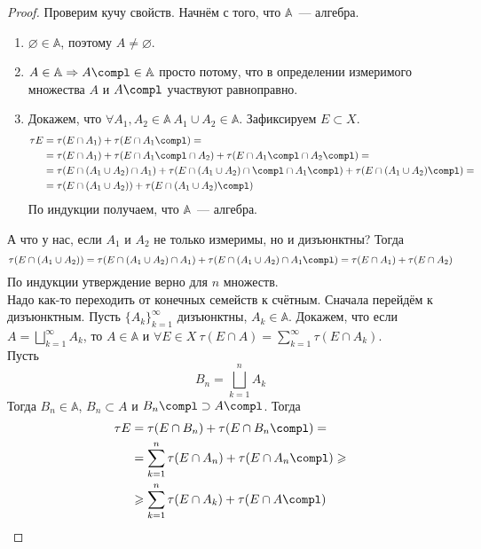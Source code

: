 \documentclass{article}
\begin{document}
    \begin{proof}
        Проверим кучу свойств. Начнём с того, что $\mathbb A$~--- алгебра.
        \begin{enumerate}
            \addtocounter{enumi}{-1}
            \item $\varnothing\in\mathbb A$, поэтому $A\neq\varnothing$.
            \item $A\in\mathbb A\Rightarrow A\compl\in\mathbb A$ просто потому, что в определении измеримого множества $A$ и $A\compl$ участвуют равноправно.
            \item Докажем, что $\forall A_1,A_2\in\mathbb A~A_1\cup A_2\in\mathbb A$. Зафиксируем $E\subset X$.
            \[\begin{split}
                \tau E&=\tau(E\cap A_1)+\tau(E\cap A_1\compl)=\\
                &=\tau(E\cap A_1)+\tau(E\cap A_1\compl\cap A_2)+\tau(E\cap A_1\compl\cap A_2\compl)=\\
                &=\tau(E\cap(A_1\cup A_2)\cap A_1)+\tau(E\cap (A_1\cup A_2)\cap\compl\cap A_1\compl)+\tau(E\cap(A_1\cup A_2)\compl)=\\
                &=\tau(E\cap(A_1\cup A_2))+\tau(E\cap(A_1\cup A_2)\compl)
            \end{split}\]
            По индукции получаем, что $\mathbb A$~--- алгебра.
        \end{enumerate}
        А что у нас, если $A_1$ и $A_2$ не только измеримы, но и дизъюнктны? Тогда
        $$
        \tau(E\cap(A_1\cup A_2))=\tau(E\cap(A_1\cup A_2)\cap A_1)+\tau(E\cap(A_1\cup A_2)\cap A_1\compl)=\tau(E\cap A_1)+\tau(E\cap A_2)
        $$
        По индукции утверждение верно для $n$ множеств.\\
        Надо как-то переходить от конечных семейств к счётным. Сначала перейдём к дизъюнктным. Пусть $\{A_k\}_{k=1}^\infty$ дизъюнктны, $A_k\in\mathbb A$. Докажем, что если $A=\bigsqcup\limits_{k=1}^\infty A_k$, то $A\in\mathbb A$ и $\forall E\in X~\tau(E\cap A)=\sum\limits_{k=1}^\infty \tau(E\cap A_k)$.\\
        Пусть
        $$
        B_n=\bigsqcup\limits_{k=1}^nA_k
        $$
        Тогда $B_n\in\mathbb A$, $B_n\subset A$ и $B_n\compl\supset A\compl$. Тогда
        \[\begin{split}
            \tau E&=\tau(E\cap B_n)+\tau(E\cap B_n\compl)=\\
            &=\sum\limits_{k=1}^n\tau(E\cap A_n)+\tau(E\cap A_n\compl)\geqslant\\
            &\geqslant\sum\limits_{k=1}^n\tau(E\cap A_k)+\tau(E\cap A\compl)

\end{split}\]
\end{proof}
\end{document}
